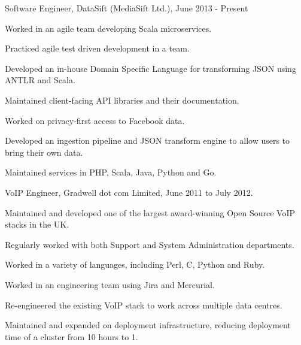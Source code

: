 \documentclass[a4paper]{article}
\renewenvironment{itemize}{
  \begin{list}{}{
    \setlength{\leftmargin}{1.5em}
  }
}{
  \end{list}
}
\newenvironment{packed}{
\begin{itemize}
  \setlength{\itemsep}{0pt}
  \setlength{\parskip}{0pt}
  \setlength{\parsep}{0pt}
}{\end{itemize}}
\begin{document}
\begin{itemize}
\item Software Engineer, DataSift (MediaSift Ltd.), June 2013 - Present
        \begin{packed}
            \item Worked in an agile team developing Scala microservices.
            \item Practiced agile test driven development in a team.
            \item Developed an in-house Domain Specific Language for transforming JSON using ANTLR and Scala.
            \item Maintained client-facing API libraries and their documentation.
            \item Worked on privacy-first access to Facebook data.
            \item Developed an ingestion pipeline and JSON transform engine to allow users to bring their own data.
            \item Maintained services in PHP, Scala, Java, Python and Go.
        \end{packed}
\end{itemize}

\begin{itemize}
\item VoIP Engineer, Gradwell dot com Limited, June 2011 to July 2012.
        \begin{packed}
            \item Maintained and developed one of the largest award-winning Open Source VoIP stacks in the UK.
            \item Regularly worked with both Support and System Administration departments.
            \item Worked in a variety of languages, including Perl, C, Python and Ruby.
            \item Worked in an engineering team using Jira and Mercurial.
            \item Re-engineered the existing VoIP stack to work across multiple data centres.
            \item Maintained and expanded on deployment infrastructure, reducing deployment time of a cluster from 10 hours to 1.
        \end{packed}
\end{itemize}
\end{document}
